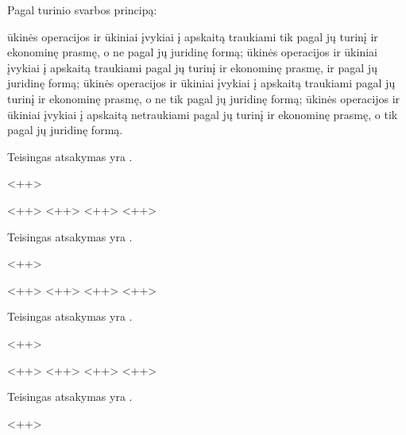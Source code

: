 \begin{tasks}
  \begin{task}
    \begin{condition}
      Pagal turinio svarbos principą:
      \begin{enumerate}
         ūkinės operacijos ir ūkiniai įvykiai į apskaitą
          traukiami tik pagal jų turinį ir ekonominę prasmę, o ne
          pagal jų juridinę formą;
         ūkinės operacijos ir ūkiniai įvykiai į apskaitą
          traukiami pagal jų turinį ir ekonominę prasmę, ir pagal
          jų juridinę formą;
         ūkinės operacijos ir ūkiniai įvykiai į apskaitą
          traukiami pagal jų turinį ir ekonominę prasmę, o ne tik
          pagal jų juridinę formą;
         ūkinės operacijos ir ūkiniai įvykiai į apskaitą
          netraukiami pagal jų turinį ir ekonominę prasmę, o tik
          pagal jų juridinę formą.
      \end{enumerate}
    \end{condition}
    \begin{solution}
      Teisingas atsakymas yra .
    \end{solution}
  \end{task}

  \begin{task}
    \begin{condition}
      <++>
      \begin{enumerate}
         <++>
         <++>
         <++>
         <++>
      \end{enumerate}
    \end{condition}
    \begin{solution}
      Teisingas atsakymas yra \tref{<++>}.
    \end{solution}
  \end{task}

  \begin{task}
    \begin{condition}
      <++>
      \begin{enumerate}
         <++>
         <++>
         <++>
         <++>
      \end{enumerate}
    \end{condition}
    \begin{solution}
      Teisingas atsakymas yra \tref{<++>}.
    \end{solution}
  \end{task}

  \begin{task}
    \begin{condition}
      <++>
      \begin{enumerate}
         <++>
         <++>
         <++>
         <++>
      \end{enumerate}
    \end{condition}
    \begin{solution}
      Teisingas atsakymas yra \tref{<++>}.
    \end{solution}
  \end{task}
  
\end{tasks}<++>

